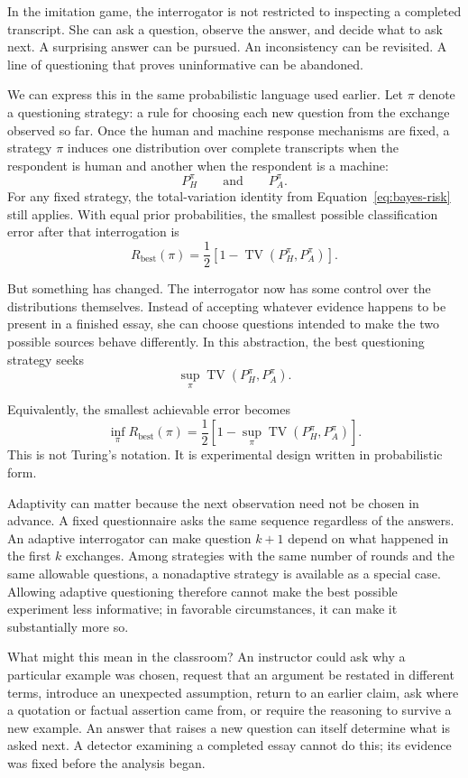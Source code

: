 \documentclass[pdflatex,sn-mathphys-num]{sn-jnl}
\begin{document}
In the imitation game, the interrogator is not restricted to inspecting a completed transcript. She can ask a question, observe 
the answer, and decide what to ask next. A surprising answer can be pursued. An inconsistency can be revisited. A line of 
questioning that proves uninformative can be abandoned.

We can express this in the same probabilistic language used earlier. Let \(\pi\) denote a questioning strategy: a rule for 
choosing each new question from the exchange observed so far. Once the human and machine response mechanisms are 
fixed, a strategy \(\pi\) induces one distribution over complete transcripts when the respondent is human and another when the respondent is a machine:
\[
P_H^\pi
\qquad\text{and}\qquad
P_A^\pi.
\]
For any fixed strategy, the total-variation identity from Equation~\eqref{eq:bayes-risk} still applies. With equal prior probabilities, the 
smallest possible classification error after that interrogation is
\[
R_{\mathrm{best}}(\pi)=\frac12
\left[
1-\operatorname{TV}\!\left(P_H^\pi,P_A^\pi\right)
\right].
\]

But something has changed. The interrogator now has some control over the distributions themselves. Instead of accepting 
whatever evidence happens to be present in a finished essay, she can choose questions intended to make the two possible
sources behave differently. In this abstraction, the best questioning strategy seeks
\[
\sup_{\pi}
\operatorname{TV}\!\left(P_H^\pi,P_A^\pi\right).
\]

Equivalently, the smallest achievable error becomes
\[
\inf_{\pi}R_{\mathrm{best}}(\pi)=\frac12
\left[
1-
\sup_{\pi}
\operatorname{TV}\!\left(P_H^\pi,P_A^\pi\right)
\right].
\]
This is not Turing's notation. It is experimental design written in probabilistic form.

Adaptivity can matter because the next observation need not be chosen in advance. A fixed questionnaire asks the same 
sequence regardless of the answers. An adaptive interrogator can make question \(k+1\) depend on what happened in the 
first \(k\) exchanges. Among strategies with the same number of rounds and the same allowable questions, a nonadaptive strategy is available as a special case. Allowing adaptive questioning therefore cannot make 
the best possible experiment less informative; in favorable circumstances, it can make it substantially more so.

What might this mean in the classroom? An instructor could ask why a particular example was chosen, request that an argument be restated in different terms, 
introduce an unexpected assumption, return to an earlier claim, ask where a quotation or factual assertion came from, or 
require the reasoning to survive a new example. An answer that raises a new question can itself determine what is asked next. A detector examining a completed essay cannot do this; its evidence was 
fixed before the analysis began.
\end{document}
